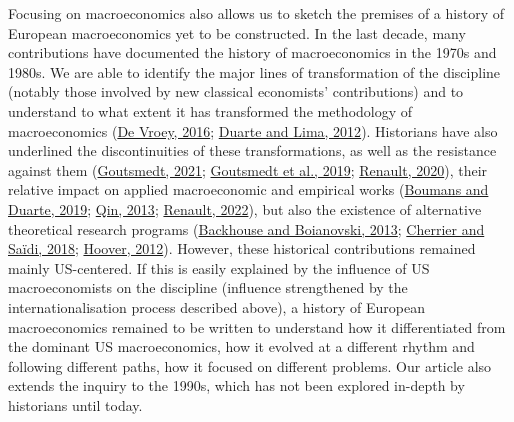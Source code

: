 \documentclass[]{elsarticle} %
\begin{document}
Focusing on macroeconomics also allows us to sketch the premises of a
history of European macroeconomics yet to be constructed. In the last
decade, many contributions have documented the history of macroeconomics
in the 1970s and 1980s. We are able to identify the major lines of
transformation of the discipline (notably those involved by new
classical economists' contributions) and to understand to what extent it
has transformed the methodology of macroeconomics
(\protect\hyperlink{ref-devroey2016}{De Vroey, 2016};
\protect\hyperlink{ref-duartelima2012a}{Duarte and Lima, 2012}).
Historians have also underlined the discontinuities of these
transformations, as well as the resistance against them
(\protect\hyperlink{ref-goutsmedt2021b}{Goutsmedt, 2021};
\protect\hyperlink{ref-goutsmedtetal2019}{Goutsmedt et al., 2019};
\protect\hyperlink{ref-renault2020a}{Renault, 2020}), their relative
impact on applied macroeconomic and empirical works
(\protect\hyperlink{ref-boumans2019}{Boumans and Duarte, 2019};
\protect\hyperlink{ref-qin2013a}{Qin, 2013};
\protect\hyperlink{ref-renault2022}{Renault, 2022}), but also the
existence of alternative theoretical research programs
(\protect\hyperlink{ref-backhouseboianovski2013}{Backhouse and
Boianovski, 2013}; \protect\hyperlink{ref-cherrier2018c}{Cherrier and
Saïdi, 2018}; \protect\hyperlink{ref-hoover2012}{Hoover, 2012}).
However, these historical contributions remained mainly US-centered. If
this is easily explained by the influence of US macroeconomists on the
discipline (influence strengthened by the internationalisation process
described above), a history of European macroeconomics remained to be
written to understand how it differentiated from the dominant US
macroeconomics, how it evolved at a different rhythm and following
different paths, how it focused on different problems. Our article also
extends the inquiry to the 1990s, which has not been explored in-depth
by historians until today.
\end{document}
